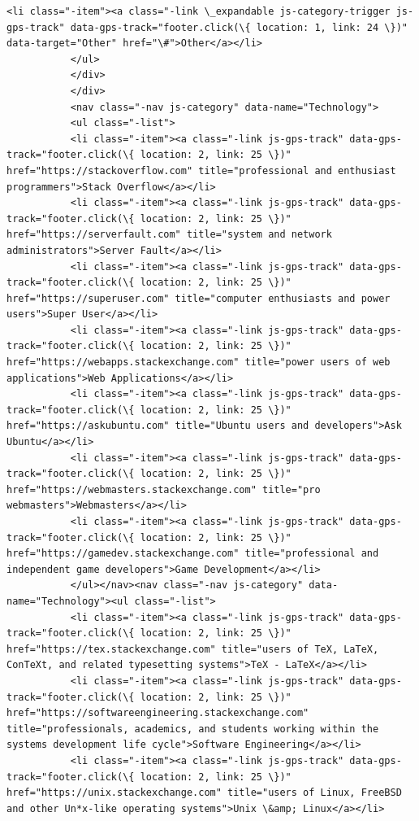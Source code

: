 \documentclass[11pt]{article}
\begin{document}
\begin{Verbatim}[commandchars=\\\{\}]
           <li class="-item"><a class="-link \_expandable js-category-trigger js-gps-track" data-gps-track="footer.click(\{ location: 1, link: 24 \})" data-target="Other" href="\#">Other</a></li>
           </ul>
           </div>
           </div>
           <nav class="-nav js-category" data-name="Technology">
           <ul class="-list">
           <li class="-item"><a class="-link js-gps-track" data-gps-track="footer.click(\{ location: 2, link: 25 \})" href="https://stackoverflow.com" title="professional and enthusiast programmers">Stack Overflow</a></li>
           <li class="-item"><a class="-link js-gps-track" data-gps-track="footer.click(\{ location: 2, link: 25 \})" href="https://serverfault.com" title="system and network administrators">Server Fault</a></li>
           <li class="-item"><a class="-link js-gps-track" data-gps-track="footer.click(\{ location: 2, link: 25 \})" href="https://superuser.com" title="computer enthusiasts and power users">Super User</a></li>
           <li class="-item"><a class="-link js-gps-track" data-gps-track="footer.click(\{ location: 2, link: 25 \})" href="https://webapps.stackexchange.com" title="power users of web applications">Web Applications</a></li>
           <li class="-item"><a class="-link js-gps-track" data-gps-track="footer.click(\{ location: 2, link: 25 \})" href="https://askubuntu.com" title="Ubuntu users and developers">Ask Ubuntu</a></li>
           <li class="-item"><a class="-link js-gps-track" data-gps-track="footer.click(\{ location: 2, link: 25 \})" href="https://webmasters.stackexchange.com" title="pro webmasters">Webmasters</a></li>
           <li class="-item"><a class="-link js-gps-track" data-gps-track="footer.click(\{ location: 2, link: 25 \})" href="https://gamedev.stackexchange.com" title="professional and independent game developers">Game Development</a></li>
           </ul></nav><nav class="-nav js-category" data-name="Technology"><ul class="-list">
           <li class="-item"><a class="-link js-gps-track" data-gps-track="footer.click(\{ location: 2, link: 25 \})" href="https://tex.stackexchange.com" title="users of TeX, LaTeX, ConTeXt, and related typesetting systems">TeX - LaTeX</a></li>
           <li class="-item"><a class="-link js-gps-track" data-gps-track="footer.click(\{ location: 2, link: 25 \})" href="https://softwareengineering.stackexchange.com" title="professionals, academics, and students working within the systems development life cycle">Software Engineering</a></li>
           <li class="-item"><a class="-link js-gps-track" data-gps-track="footer.click(\{ location: 2, link: 25 \})" href="https://unix.stackexchange.com" title="users of Linux, FreeBSD and other Un*x-like operating systems">Unix \&amp; Linux</a></li>

\end{Verbatim}
\end{document}
